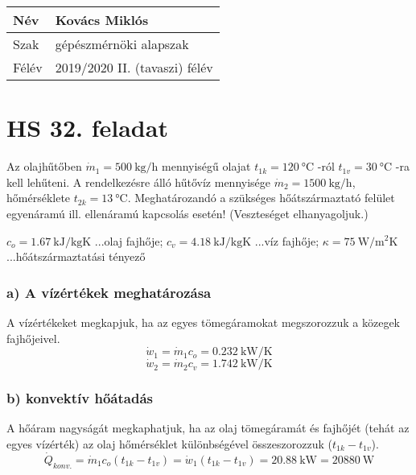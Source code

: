 \begin{tabular}{ | p{2cm} | p{14cm} | } 
	\hline
	Név & Kovács Miklós \\ 
	\hline
	Szak & gépészmérnöki alapszak \\ 
	\hline
	Félév & 2019/2020 II. (tavaszi) félév \\ 
	\hline
\end{tabular}

\section*{HS 32. feladat} 

Az olajhűtőben $\dot{m}_1 = \SI{500}{\kilogram\per\hour}$ mennyiségű olajat $t_{1k} = \SI{120}{\celsius}$ -ról $t_{1v} = \SI{30}{\celsius}$ -ra kell lehűteni. A rendelkezésre álló hűtővíz mennyisége $\dot{m}_2 = \SI{1500}{\kilogram\per\hour}$, hőmérséklete $t_{2k} = \SI{13}{\celsius}$. Meghatározandó a szükséges hőátszármaztató felület egyenáramú ill. ellenáramú kapcsolás esetén! (Veszteséget elhanyagoljuk.)

$c_o = \SI{1,67}{\kilo\joule\per\kilogram\kelvin}$ ...olaj fajhője;
$c_v = \SI{4,18}{\kilo\joule\per\kilogram\kelvin}$ ...víz fajhője;
$\kappa = \SI{75}{\watt\per\meter\squared\kelvin}$ ...hőátszármaztatási tényező

\subsubsection*{a) A vízértékek meghatározása }
A vízértékeket megkapjuk, ha az egyes tömegáramokat megszorozzuk a közegek fajhőjeivel.
\begin{equation}
\dot{w}_1 = \dot{m}_1 c_o = \SI{0,232}{\kilo\watt\per\kelvin}
\end{equation}
\begin{equation}
\dot{w}_2 = \dot{m}_2 c_v = \SI{1,742}{\kilo\watt\per\kelvin}
\end{equation}

\subsubsection*{b) konvektív hőátadás }
A hőáram nagyságát megkaphatjuk, ha az olaj tömegáramát és fajhőjét (tehát az egyes vízérték) az olaj hőmérséklet különbségével összeszorozzuk ($t_{1k} - t_{1v}$).
\begin{equation}
\dot{Q}_{konv.} = \dot{m}_1 c_o (t_{1k} - t_{1v}) = \dot{w}_1  (t_{1k} - t_{1v}) =\SI{20,88}{\kilo\watt} =\SI{20880}{\watt}
\end{equation}

